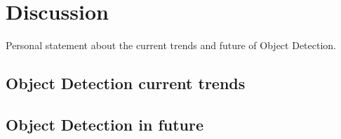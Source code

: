 \documentclass[12pt]{report}
\begin{document}
\chapter{Discussion}
Personal statement about the current trends and future of Object Detection.

\newpage

\section{Object Detection current trends}

\section{Object Detection in future}


\printbibliography[title=References]
\end{document}
